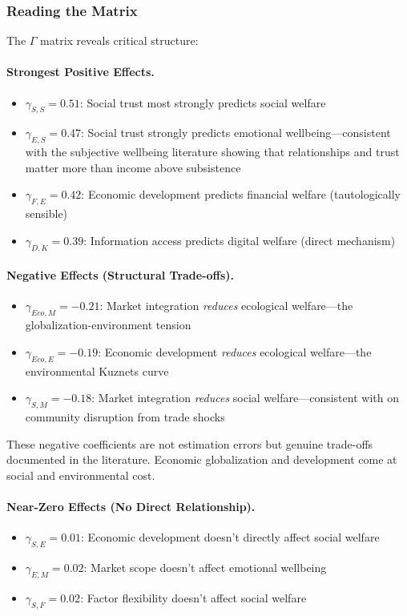 \subsubsection{Reading the Matrix}

The $\Gamma$ matrix reveals critical structure:

\paragraph{Strongest Positive Effects.}
\begin{itemize}
  \item $\gamma_{S,S} = 0.51$: Social trust most strongly predicts social welfare
  \item $\gamma_{E,S} = 0.47$: Social trust strongly predicts emotional wellbeing---consistent with the subjective wellbeing literature showing that relationships and trust matter more than income above subsistence \citep{helliwell2004social}
  \item $\gamma_{F,E} = 0.42$: Economic development predicts financial welfare (tautologically sensible)
  \item $\gamma_{D,K} = 0.39$: Information access predicts digital welfare (direct mechanism)
\end{itemize}

\paragraph{Negative Effects (Structural Trade-offs).}
\begin{itemize}
  \item $\gamma_{Eco,M} = -0.21$: Market integration \emph{reduces} ecological welfare---the globalization-environment tension
  \item $\gamma_{Eco,E} = -0.19$: Economic development \emph{reduces} ecological welfare---the environmental Kuznets curve
  \item $\gamma_{S,M} = -0.18$: Market integration \emph{reduces} social welfare---consistent with \citet{autor2013china} on community disruption from trade shocks
\end{itemize}

These negative coefficients are not estimation errors but genuine trade-offs documented in the literature. Economic globalization and development come at social and environmental cost.

\paragraph{Near-Zero Effects (No Direct Relationship).}
\begin{itemize}
  \item $\gamma_{S,E} = 0.01$: Economic development doesn't directly affect social welfare
  \item $\gamma_{E,M} = 0.02$: Market scope doesn't affect emotional wellbeing
  \item $\gamma_{S,F} = 0.02$: Factor flexibility doesn't affect social welfare
\end{itemize}


